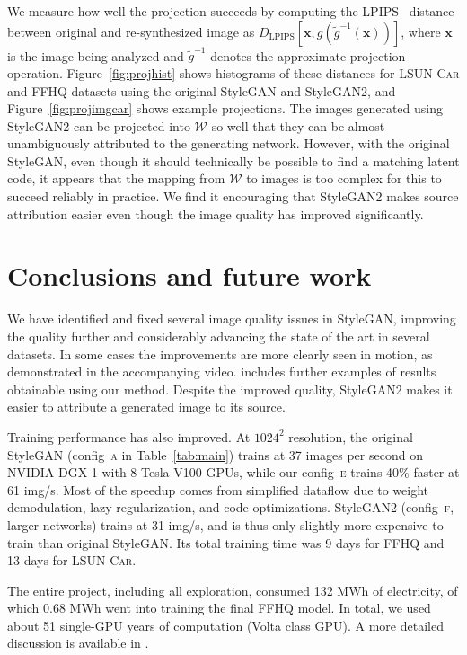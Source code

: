 \documentclass[10pt,twocolumn,letterpaper]{article}
\newcommand{\arch}[1]{\textsc{#1}}
\newcommand{\FINAL}[2][]{#2} %
\newcommand{\WW}{\mathcal{W}}
\begin{document}
We measure how well the projection succeeds by computing the LPIPS~\cite{Zhang2018metric} distance
between original and re-synthesized image as \mbox{$D_\mathrm{LPIPS}[\boldsymbol{x}, g(\tilde{g}^{-1}(\boldsymbol{x}))]$}, where $\boldsymbol{x}$ is the image being analyzed
and \mbox{$\tilde{g}^{-1}$} denotes the approximate projection operation.
Figure~\ref{fig:projhist} shows histograms of these distances for \textsc{LSUN Car} and \textsc{FFHQ} datasets using the original StyleGAN and StyleGAN2, and
Figure~\ref{fig:projimgcar} shows example projections. 
\FINAL{The images generated using StyleGAN2 can be projected into $\WW$ so well that they can be almost unambiguously attributed to the generating network.
However, with the original StyleGAN, even though it should technically be possible to find a matching latent code, it appears that the mapping from $\WW$ to images is too complex for this to succeed reliably in practice.
We find it encouraging that StyleGAN2 makes source attribution easier even though the image quality has improved significantly.}

\section{Conclusions and future work}

We have identified and fixed several image quality issues in StyleGAN, improving the quality further and considerably advancing the state of the art in several datasets.
In some cases the improvements are more clearly seen in motion, as demonstrated in the accompanying video.
 includes further examples of results obtainable using our method.
\FINAL{Despite the improved quality, StyleGAN2 makes it easier to attribute a generated image to its source.}

Training performance has also improved.
At $1024^2$ resolution, the original StyleGAN (config~\arch{a} in Table~\ref{tab:main}) trains at 37 images per second on NVIDIA DGX-1 with 8 Tesla V100 GPUs, while our config~\arch{e} trains 40\% faster at 61 img/s.
Most of the speedup comes from simplified dataflow due to weight demodulation, lazy regularization, and code optimizations.
StyleGAN2 (config~\arch{f}, larger networks) trains at 31 img/s, and is thus only slightly more expensive to train than original StyleGAN.
Its total training time was 9 days for \textsc{FFHQ} and 13 days for \textsc{LSUN Car}.

\FINAL{The entire project, including all exploration, consumed 132 MWh of electricity, of which 0.68 MWh went into training the final \textsc{FFHQ} model. In total, we used about 51 single-GPU years of computation (Volta class GPU). A more detailed discussion is available in \refapppower{}.}
\end{document}
